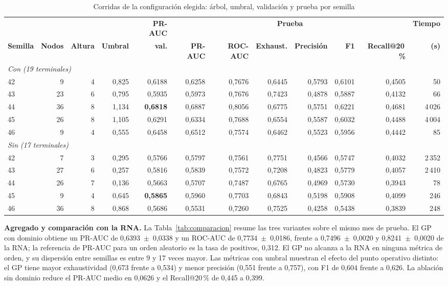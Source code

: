 \documentclass[conference]{IEEEtran}
\newcommand{\col}[1]{\texttt{\detokenize{#1}}}
\begin{document}
\begin{table}[htbp]
\caption{Corridas de la configuración elegida: árbol, umbral, validación y prueba por semilla}
\label{tab:semillas}
\centering
\footnotesize
\setlength{\tabcolsep}{5pt}
\begin{tabular}{lrrrrrrrrrrr}
\toprule
& & & & \textbf{PR-AUC} & \multicolumn{6}{c}{\textbf{Prueba}} & \textbf{Tiempo}\\
\cmidrule(lr){6-11}
\textbf{Semilla} & \textbf{Nodos} & \textbf{Altura} & \textbf{Umbral} & \textbf{val.} & \textbf{PR-AUC} & \textbf{ROC-AUC} & \textbf{Exhaust.} & \textbf{Precisión} & \textbf{F1} & \textbf{Recall@20\,\%} & \textbf{(s)}\\
\midrule
\multicolumn{12}{l}{\textit{Con} \col{DOM_DOMAIN_ID} \textit{(19 terminales)}}\\
42 & 9 & 4 & 0,825 & 0,6188 & 0,6258 & 0,7676 & 0,6445 & 0,5793 & 0,6101 & 0,4505 & 50\\
43 & 23 & 6 & 0,795 & 0,5935 & 0,5973 & 0,7676 & 0,7423 & 0,4878 & 0,5887 & 0,4132 & 66\\
44 & 36 & 8 & 1,134 & \textbf{0,6818} & 0,6887 & 0,8056 & 0,6775 & 0,5751 & 0,6221 & 0,4681 & 4\,026\\
45 & 26 & 8 & 1,105 & 0,6291 & 0,6334 & 0,7688 & 0,6554 & 0,5587 & 0,6032 & 0,4488 & 4\,004\\
46 & 9 & 4 & 0,555 & 0,6458 & 0,6512 & 0,7574 & 0,6462 & 0,5523 & 0,5956 & 0,4442 & 85\\
\midrule
\multicolumn{12}{l}{\textit{Sin} \col{DOM_DOMAIN_ID} \textit{(17 terminales)}}\\
42 & 7 & 3 & 0,295 & 0,5766 & 0,5797 & 0,7561 & 0,7751 & 0,4566 & 0,5747 & 0,4032 & 2\,352\\
43 & 27 & 6 & 0,257 & 0,5816 & 0,5839 & 0,7572 & 0,7208 & 0,4823 & 0,5779 & 0,4057 & 2\,410\\
44 & 26 & 7 & 0,136 & 0,5663 & 0,5707 & 0,7487 & 0,6765 & 0,4969 & 0,5730 & 0,3943 & 78\\
45 & 9 & 4 & 0,645 & \textbf{0,5865} & 0,5960 & 0,7703 & 0,6843 & 0,5198 & 0,5908 & 0,4099 & 246\\
46 & 36 & 8 & 0,868 & 0,5686 & 0,5531 & 0,7260 & 0,7525 & 0,4258 & 0,5438 & 0,3839 & 248\\
\bottomrule
\end{tabular}
\end{table}

\textbf{Agregado y comparación con la RNA.} La Tabla~\ref{tab:comparacion}
resume las tres variantes sobre el mismo mes de prueba. El GP con dominio
obtiene un PR-AUC de 0,6393~$\pm$~0,0338 y un ROC-AUC de 0,7734~$\pm$~0,0186,
frente a 0,7496~$\pm$~0,0020 y 0,8241~$\pm$~0,0020 de la RNA; la referencia
de PR-AUC para un orden aleatorio es la tasa de positivos, 0,312. El GP no
alcanza a la RNA en ninguna métrica de orden, y su dispersión entre semillas
es entre 9 y 17 veces mayor. Las métricas con umbral muestran el efecto del
punto operativo distinto: el GP tiene mayor exhaustividad (0,673 frente a
0,534) y menor precisión (0,551 frente a 0,757), con F1 de 0,604 frente a
0,626. La ablación sin dominio reduce el PR-AUC medio en 0,0626 y el
Recall@20\,\% de 0,445 a 0,399.
\end{document}

